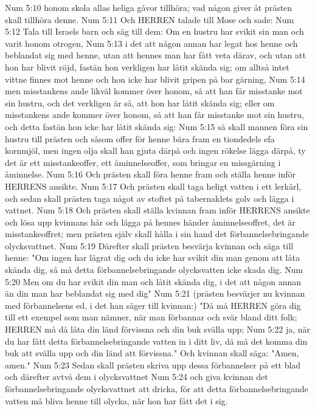 Num 5:10  honom skola allas heliga gåvor tillhöra; vad någon giver åt prästen skall tillhöra denne.
Num 5:11  Och HERREN talade till Mose och sade:
Num 5:12  Tala till Israels barn och säg till dem: Om en hustru har svikit sin man och varit honom otrogen,
Num 5:13  i det att någon annan har legat hos henne och beblandat sig med henne, utan att hennes man har fått veta därav, och utan att hon har blivit röjd, fastän hon verkligen har låtit skända sig; om alltså intet vittne finnes mot henne och hon icke har blivit gripen på bar gärning,
Num 5:14  men misstankens ande likväl kommer över honom, så att han får misstanke mot sin hustru, och det verkligen är så, att hon har låtit skända sig; eller om misstankens ande kommer över honom, så att han får misstanke mot sin hustru, och detta fastän hon icke har låtit skända sig:
Num 5:15  så skall mannen föra sin hustru till prästen och såsom offer för henne bära fram en tiondedels efa kornmjöl, men ingen olja skall han gjuta därpå och ingen rökelse lägga därpå, ty det är ett misstankeoffer, ett åminnelseoffer, som bringar en missgärning i åminnelse.
Num 5:16  Och prästen skall föra henne fram och ställa henne inför HERRENS ansikte.
Num 5:17  Och prästen skall taga heligt vatten i ett lerkärl, och sedan skall prästen taga något av stoftet på tabernaklets golv och lägga i vattnet.
Num 5:18  Och prästen skall ställa kvinnan fram inför HERRENS ansikte och lösa upp kvinnans hår och lägga på hennes händer åminnelseoffret, det är misstankeoffret; men prästen själv skall hålla i sin hand det förbannelsebringande olycksvattnet.
Num 5:19  Därefter skall prästen besvärja kvinnan och säga till henne: "Om ingen har lägrat dig och du icke har svikit din man genom att låta skända dig, så må detta förbannelsebringande olycksvatten icke skada dig.
Num 5:20  Men om du har svikit din man och låtit skända dig, i det att någon annan än din man har beblandat sig med dig"
Num 5:21  (prästen besvärjer nu kvinnan med förbannelsens ed, i det han säger till kvinnan:) "Då må HERREN göra dig till ett exempel som man nämner, när man förbannar och svär bland ditt folk; HERREN må då låta din länd förvissna och din buk svälla upp;
Num 5:22  ja, när du har fått detta förbannelsebringande vatten in i ditt liv, då må det komma din buk att svälla upp och din länd att förvissna." Och kvinnan skall säga: "Amen, amen."
Num 5:23  Sedan skall prästen skriva upp dessa förbannelser på ett blad och därefter avtvå dem i olycksvattnet
Num 5:24  och giva kvinnan det förbannelsebringande olycksvattnet att dricka, för att detta förbannelsebringande vatten må bliva henne till olycka, när hon har fått det i sig.
